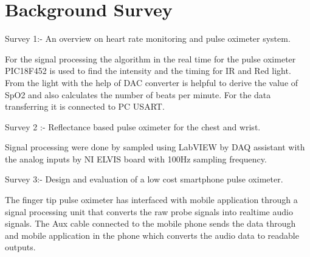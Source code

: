 \section{Background Survey}

Survey 1:- An overview on heart rate monitoring and pulse oximeter system.

				For the signal processing the algorithm in the real time for the pulse oximeter PIC18F452 is used to find the intensity and the timing for IR and Red light. From the light with the help of DAC converter is helpful to derive the value of SpO2 and also calculates the number of beats per minute. For the data transferring it is connected to PC USART.
				

Survey 2 :- Reflectance based pulse oximeter for the chest and wrist.

				Signal processing were done by sampled using LabVIEW by DAQ assistant with the analog inputs by NI ELVIS board with 100Hz sampling frequency.
					
					
Survey 3:- Design and evaluation of a low cost smartphone pulse oximeter.

				The finger tip pulse oximeter has interfaced with mobile application through a signal processing unit that converts the raw probe signals into realtime audio signals. The Aux cable connected to the mobile phone sends the data through and mobile application in the phone which converts the audio data to readable outputs. 

